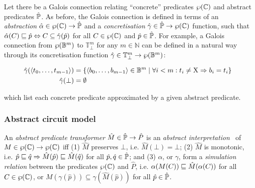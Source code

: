 Let there be a Galois connection relating ``concrete'' predicates $\wp(\mathbb{C})$ and abstract predicates $\hat{\mathbb{P}}$. As before, the Galois connection is defined in terms of an \textit{abstraction} $\hat \alpha \in \wp(\mathbb{C}) \rightarrow \hat{\mathbb{P}}$ and a \textit{concretisation} $\hat \gamma \in \hat{\mathbb{P}} \rightarrow \wp(\mathbb{C})$ function, such that $\hat \alpha(C) \sqsubseteq \hat p \Leftrightarrow C \subseteq \hat \gamma(\hat p)$ for all $C \in \wp(\mathbb{C})$ and $\hat p \in \hat{\mathbb{P}}$. For example, a Galois connection from $\wp(\mathbb{B}^{m})$ to $\mathbb{T}_{\bot}^{m}$ for any $m \in \mathbb{N}$ can be defined in a natural way through its concretisation function $\hat \gamma \in \mathbb{T}_{\bot}^{m} \rightarrow \wp(\mathbb{B}^{m})$:

\begin{align*}
\hat \gamma ( \langle t_{0}, \dots,t_{m-1} \rangle ) &= \{ \langle b_{0}, \dots,b_{m-1} \rangle \in \mathbb{B}^{m} \mid \forall i < m : t_{i} \neq \mathrm{X} \Rightarrow b_{i} = t_{i} \} \\
\hat \gamma ( \bot ) &= \emptyset
\end{align*}

\noindent which list each concrete predicate approximated by a given abstract predicate.



\subsubsection{Abstract circuit model} \label{sec:lat-ste-model}

An \textit{abstract predicate transformer} $\hat M \in \hat{\mathbb{P}} \rightarrow \hat P$ is an \textit{abstract interpretation}~\cite{chou1999,cousot1996} of $M \in \wp(\mathbb{C}) \rightarrow \wp(\mathbb{C})$ iff (1) $\hat M$ preserves $\bot$, i.e. $\hat M(\bot) = \bot$; (2) $\hat M$ is monotonic, i.e. $\hat p \sqsubseteq \hat q \Rightarrow \hat M (\hat p) \sqsubseteq \hat M (\hat q)$ for all $\hat p, \hat q \in \hat{\mathbb{P}}$; and (3) $\alpha$, or $\gamma$, form a \textit{simulation relation} between the predicates $\wp(\mathbb{C})$ and $\hat P$, i.e. $\alpha(M(C)) \sqsubseteq \hat M(\alpha(C))$ for all $C \in \wp(\mathbb{C})$, or $M(\gamma(\hat p)) \subseteq \gamma(\hat M(\hat p))$ for all $\hat p \in \hat{\mathbb{P}}$.

